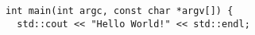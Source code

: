 \begin{verbatim}
int main(int argc, const char *argv[]) {
  std::cout << "Hello World!" << std::endl;
\end{verbatim}

